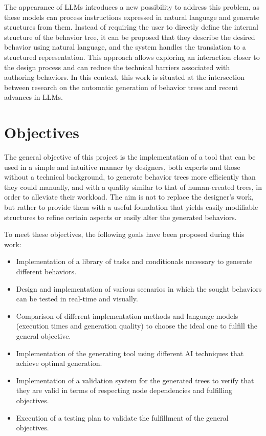 The appearance of LLMs introduces a new possibility to address this problem, as these models can process instructions expressed in natural language and generate structures from them.
Instead of requiring the user to directly define the internal structure of the behavior tree, it can be proposed that they describe the desired behavior using natural language, and the system handles the translation to a structured representation.
This approach allows exploring an interaction closer to the design process and can reduce the technical barriers associated with authoring behaviors.
In this context, this work is situated at the intersection between research on the automatic generation of behavior trees and recent advances in LLMs.

\section{Objectives}

The general objective of this project is the implementation of a tool that can be used in a simple and intuitive manner by designers, both experts and those without a technical background, to generate behavior trees more efficiently than they could manually, and with a quality similar to that of human-created trees, in order to alleviate their workload.
The aim is not to replace the designer's work, but rather to provide them with a useful foundation that yields easily modifiable structures to refine certain aspects or easily alter the generated behaviors.

To meet these objectives, the following goals have been proposed during this work:

\begin{itemize}
	\item Implementation of a library of tasks and conditionals necessary to generate different behaviors.
	\item Design and implementation of various scenarios in which the sought behaviors can be tested in real-time and visually.
	\item Comparison of different implementation methods and language models (execution times and generation quality) to choose the ideal one to fulfill the general objective.
	\item Implementation of the generating tool using different AI techniques that achieve optimal generation.
	\item Implementation of a validation system for the generated trees to verify that they are valid in terms of respecting node dependencies and fulfilling objectives.
	\item Execution of a testing plan to validate the fulfillment of the general objectives.
\end{itemize}

